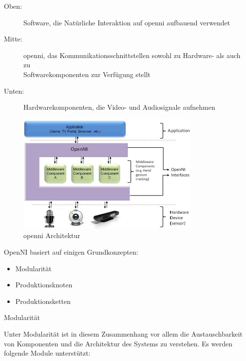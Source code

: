\begin{description}
  \item[Oben:] Software, die Natürliche Interaktion auf \gls{openni} aufbauend
  verwendet
  \item[Mitte:] \gls{openni}, das Kommunikationsschnittstellen sowohl zu
  Hardware- als auch zu\\ Softwarekomponenten zur Verfügung stellt
  \item[Unten:] Hardwarekomponenten, die Video- und Audiosignale aufnehmen
\end{description}

\begin{figure}[h]
\center
\includegraphics[scale=0.8]{graphics/openNI.jpg}
\caption{\label{fig:openNI} \gls{openni} Architektur \citep{openNI2012}}
\end{figure}

OpenNI basiert auf einigen Grundkonzepten:

\begin{itemize}
  \item Modularität
  \item Produktionsknoten
  \item Produktionsketten
\end{itemize}

\newpage
{}
\begin{description}
\item[Modularität]
\end{description}

Unter Modularität ist in diesem Zusammenhang vor allem die Austauschbarkeit von Komponenten
 und die Architektur des Systems zu verstehen.
 Es werden folgende Module unterstützt:


